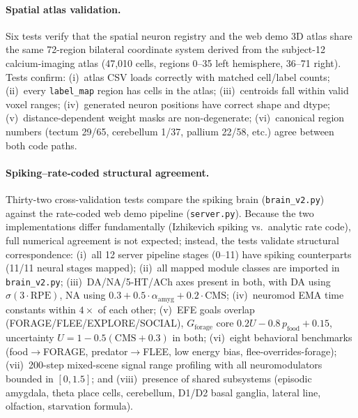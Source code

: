\documentclass[12pt]{article}
\begin{document}
\paragraph{Spatial atlas validation.}
Six tests verify that the spatial neuron registry and the web demo
3D atlas share the same 72-region bilateral coordinate system derived
from the subject-12 calcium-imaging atlas (47{,}010 cells,
regions 0--35 left hemisphere, 36--71 right).
Tests confirm: (i)~atlas CSV loads correctly with matched cell/label
counts; (ii)~every \texttt{label\_map} region has cells in the atlas;
(iii)~centroids fall within valid voxel ranges; (iv)~generated neuron
positions have correct shape and dtype; (v)~distance-dependent weight
masks are non-degenerate; (vi)~canonical region numbers (tectum 29/65,
cerebellum 1/37, pallium 22/58, etc.) agree between both code paths.

\paragraph{Spiking--rate-coded structural agreement.}
Thirty-two cross-validation tests compare the spiking brain
(\texttt{brain\_v2.py}) against the rate-coded web demo pipeline
(\texttt{server.py}).  Because the two implementations differ
fundamentally (Izhikevich spiking vs.\ analytic rate code), full
numerical agreement is not expected; instead, the tests validate
structural correspondence: (i)~all 12 server pipeline stages (0--11)
have spiking counterparts (11/11 neural stages mapped); (ii)~all mapped
module classes are imported in \texttt{brain\_v2.py};
(iii)~DA/NA/5-HT/ACh axes present in both, with DA using
$\sigma(3\cdot\text{RPE})$, NA using $0.3 + 0.5\cdot\alpha_\text{amyg}
+ 0.2\cdot\text{CMS}$; (iv)~neuromod EMA time constants within $4\times$
of each other; (v)~EFE goals overlap (FORAGE/FLEE/EXPLORE/SOCIAL),
$G_\text{forage}$ core $0.2U - 0.8\,p_\text{food} + 0.15$, uncertainty
$U = 1 - 0.5(\text{CMS} + 0.3)$ in both; (vi)~eight behavioral
benchmarks (food$\to$FORAGE, predator$\to$FLEE, low energy bias,
flee-overrides-forage); (vii)~200-step mixed-scene signal range profiling
with all neuromodulators bounded in $[0, 1.5]$; and (viii)~presence of
shared subsystems (episodic amygdala, theta place cells, cerebellum,
D1/D2 basal ganglia, lateral line, olfaction, starvation formula).
\end{document}
